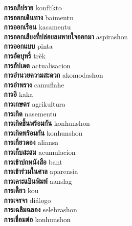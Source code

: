 \textbf{ การอภิปราย  } konflikto \\
\textbf{ การออกเดินทาง  } baimentu \\
\textbf{ การออกเรือน  } kasamentu \\
\textbf{ การออกเสียงที่ปล่อยลมหายใจออกมา  } aspirashon \\
\textbf{ การออกแบบ  } pinta \\
\textbf{ การอัดบุหรี่  } trèk \\
\textbf{ การอัปเดต  } actualisacion \\
\textbf{ การอำนวยความสะดวก  } akomodashon \\
\textbf{ การอำพราง  } camuflahe \\
\textbf{ การอึ  } kaka \\
\textbf{ การเกษตร  } agrikultura \\
\textbf{ การเกิด  } nasementu \\
\textbf{ การเกิดขึ้นพร้อมกัน  } konhunshon \\
\textbf{ การเกิดพร้อมกัน  } konhunshon \\
\textbf{ การเกี่ยวดอง  } aliansa \\
\textbf{ การเก็บสะสม  } acumulacion \\
\textbf{ การเข้าปกหนังสือ  } bant \\
\textbf{ การเข้าร่วมในศาล  } aparensia \\
\textbf{ การเคาะแป้นพิมพ์  } aanslag \\
\textbf{ การเคี้ยว  } kou \\
\textbf{ การเจรจา  } diálogo \\
\textbf{ การเฉลิมฉลอง  } selebrashon \\
\textbf{ การเชื่อมต่อ  } konhunshon \\
